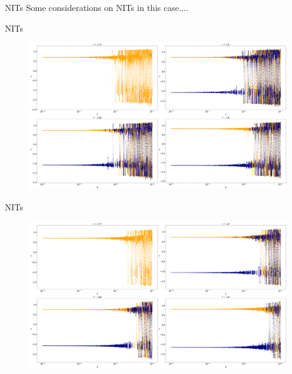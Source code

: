 \documentclass[10pt]{beamer}
\begin{document}
\begin{frame}{NITs}
	Some considerations on NITs in this case....
\end{frame}

\begin{frame}{NITs}
	\begin{figure}
		\includegraphics[width=\textwidth, height=\textheight,keepaspectratio]{figures_2/adv-NITvseps1.png}
	\end{figure}
\end{frame}

\begin{frame}{NITs}
	\begin{figure}
		\includegraphics[width=\textwidth, height=\textheight,keepaspectratio]{figures_2/adv-NITvsomega1.png}
	\end{figure}
\end{frame}
\end{document}
